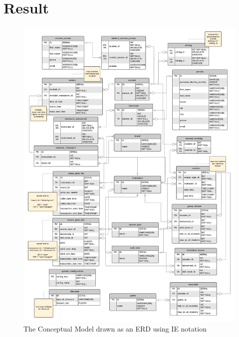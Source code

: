 \documentclass[a4paper]{scrartcl}
\begin{document}
\pagebreak
\section{Result}



\begin{figure}[h!]
  \begin{center}
    \includegraphics[width=\textwidth]{../figures/logi_phys.png}
    \caption{The Conceptual Model drawn as an ERD using IE notation}
    \label{fig:cm}
  \end{center}
\end{figure}
\end{document}
